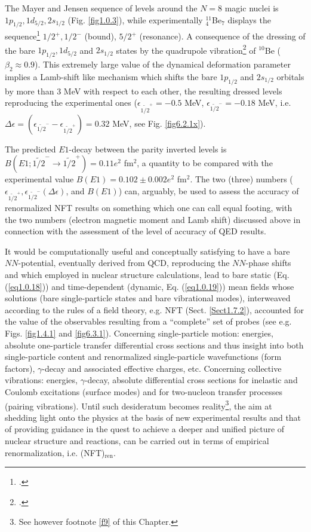 The Mayer and Jensen sequence of levels around the  $N=8$ magic nuclei is $1p_{1/2},1d_{5/2},2s_{1/2}$ (Fig. \ref{fig1.0.3}), while experimentally $^{11}_{4}$Be$_{7}$ displays the sequence\footnote{\cite{Kwan:14}.} $1/2^+,1/2^-$ (bound), $5/2^+$ (resonance). A consequence of the dressing of the bare $1p_{1/2},1d_{5/2}$ and  $2s_{1/2}$ states by the quadrupole vibration\footnote{\cite{Barranco:17}.} of $^{10}$Be ($\beta_2\approx0.9$). This extremely
large value of the dynamical deformation parameter implies a Lamb-shift like mechanism which shifts the bare $1p_{1/2}$ and $2s_{1/2}$ orbitals by more than 3 MeV with respect to each other, the resulting dressed levels reproducing the experimental ones ($\epsilon_{\widetilde {1/2}^+}=-0.5$ MeV, $\epsilon_{\widetilde {1/2}^-}=-0.18$ MeV, i.e. $\Delta\epsilon=\left(\epsilon_{\widetilde {1/2}^-}-\epsilon_{\widetilde {1/2}^+}\right)=0.32$ MeV, see Fig. \ref{fig6.2.1x}). 

 The predicted $E1$-decay between the parity inverted levels is $B(E1;\widetilde{1/2}^-\to\widetilde{1/2}^+)=0.11e^2$ fm$^2$, a quantity to be compared with the experimental value $B(E1)=0.102\pm0.002e^2$ fm$^2$. The two (three) numbers ($\epsilon_{\widetilde{1/2}^+},\epsilon_{\widetilde {1/2}^-} (\Delta\epsilon)$, and $B(E1)$) can, arguably, be used to assess the accuracy of renormalized NFT results on something which one can call equal footing, with the two numbers (electron magnetic moment and Lamb shift) discussed above in connection with the assessment of the level of accuracy of QED results. 


It would be computationally useful and conceptually satisfying to have a bare $NN$-potential, eventually derived from QCD, reproducing the $NN$-phase shifts and which employed in nuclear structure calculations, lead to bare static (Eq. (\ref{eq1.0.18})) and  time-dependent (dynamic, Eq. (\ref{eq1.0.19})) mean fields whose solutions (bare single-particle states and bare vibrational modes), interweaved according to the rules of a field theory, e.g. NFT (Sect. \ref{Sect1.7.2}), accounted for the value of the observables resulting from a ``complete'' set of probes (see e.g. Figs. \ref{fig1.4.1} and \ref{fig6.3.1}). Concerning single-particle motion: energies, absolute one-particle transfer differential cross sections and thus insight into both single-particle content and renormalized single-particle wavefunctions (form factors), $\gamma$-decay and associated effective charges, etc. Concerning collective vibrations: energies, $\gamma$-decay, absolute differential cross sections for inelastic and Coulomb excitations (surface modes) and for two-nucleon transfer processes (pairing vibrations).
Until such desideratum becomes reality\footnote{See however footnote \ref{f9} of this Chapter.}, the aim at shedding light onto the physics at the basis of new experimental results and that of providing guidance in the quest to achieve a deeper  and  unified picture of nuclear structure and reactions, can be carried out in terms of empirical renormalization, i.e. (NFT)$_{\text{ren}}$.  

